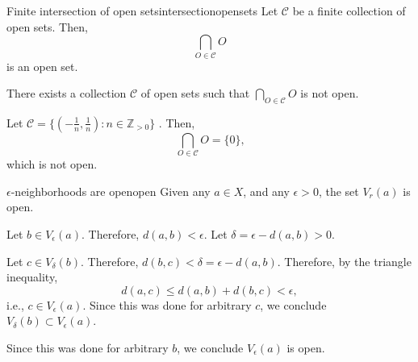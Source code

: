 \begin{prop}{Finite intersection of open sets}{intersectionopensets}
	Let \(\mathcal C\) be a finite collection of open sets. Then, \[
		\bigcap_{O \in \mathcal C} O
	\] is an open set.
\end{prop}

\begin{prop}{}{}
	There exists a collection \(\mathcal C\) of open sets such that \(\bigcap_{O \in \mathcal C} O\) is not open. 
\end{prop}

\begin{dem}{}{}
	Let \(\mathcal C = \{ (-\frac{1}{n}, \frac{1}{n}) : n \in \mathbb{Z}_{>0}\}\) . Then, \[
		\bigcap_{O \in \mathcal C} O = \{0\}\text{,}
	\] which is not open.
\end{dem}

\begin{prop}{\(\epsilon\)-neighborhoods are open}{open}
	Given any \(a \in X\), and any \(\epsilon > 0\), the set \(V_r(a)\) is open.
\end{prop}

\begin{dem}{}{}
	Let \(b \in V_\epsilon(a)\). Therefore, \(d(a, b) < \epsilon\). Let \(\delta = \epsilon - d(a, b) > 0\).

	Let \(c \in V_\delta(b)\). Therefore, \(d(b, c) < \delta = \epsilon - d(a, b)\). Therefore, by the triangle inequality, \[
		d(a, c) \leq d(a,b) + d(b, c) < \epsilon,
	\] i.e., \(c \in V_\epsilon(a)\). Since this was done for arbitrary \(c\), we conclude \(V_\delta(b) \subset V_\epsilon(a)\).

	Since this was done for arbitrary \(b\), we conclude \(V_\epsilon(a)\) is open.
\end{dem}
